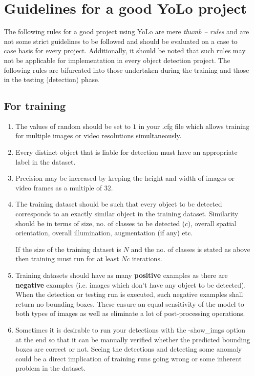 \section{Guidelines for a good YoLo project} \label{mod_guides}
The following rules for a good project using YoLo are mere
\textit{thumb – rules} and are not some strict guidelines to be
followed and should be evaluated on a case to case basis for every
project. Additionally, it should be noted that such rules may not be
applicable for implementation in every object detection project. The
following rules are bifurcated into those undertaken during the
training and those in the testing (detection) phase.

\subsection{For training} \label{for_train_guide}

\begin{enumerate}
  \item The values of {\selectfont random} should be
    set to $1$ in your  {\selectfont .cfg} file which
    allows training for multiple images or video resolutions simultaneously.
  \item Every distinct object that is liable for detection must have
    an appropriate label in the dataset.
  \item Precision may be increased by keeping the height and width of
    images or video frames as a multiple of $32$.
  \item The training dataset should be such that every object to be
    detected corresponds to an exactly similar object in the training
    dataset. Similarity should be in terms of size, no. of classes to
    be detected ($c$), overall spatial orientation, overall
    illumination, augmentation (if any) etc. \par

    If the size of the training dataset is $N$ and the no. of classes
    is stated as above then training must run for at least $Nc$ iterations.
  \item Training datasets should have as many \textbf{positive}
    examples as there are \textbf{negative} examples (i.e. images
    which don’t have any object to be detected). When the detection
    or testing run is executed, such negative examples shall return
    no bounding boxes. These ensure an equal sensitivity of the model
    to both types of images as well as eliminate a lot of
    post-processing operations.
  \item Sometimes it is desirable to run your detections with the
    {\selectfont -show\_imgs} option at the end so
    that it can be manually verified whether the predicted bounding
    boxes are correct or not. Seeing the detections and detecting
    some anomaly could be a direct implication of training runs going
    wrong or some inherent problem in the dataset.
\end{enumerate}

